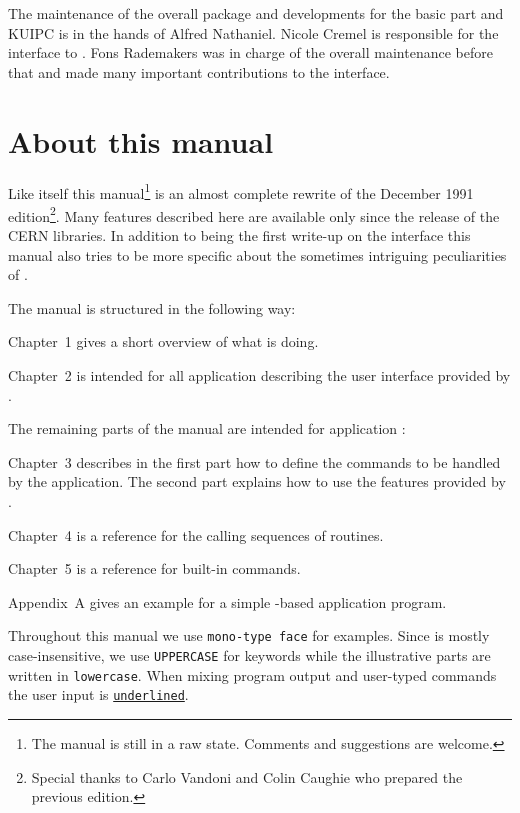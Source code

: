 The maintenance of the overall package and developments for the basic
part and KUIPC is in the hands of Alfred Nathaniel.
Nicole Cremel is responsible for the \KUIP{} interface to \OSFMotif{}.
Fons Rademakers was in charge of the overall maintenance before
that and made many important contributions to the \KUIPMotif{} interface.


\section*{About this manual}
 
Like \KUIP{} itself this manual\footnote{
The manual is still in a raw state.
Comments and suggestions are welcome.
}
is an almost complete rewrite of the
December 1991 edition\footnote{
Special thanks to Carlo Vandoni and Colin Caughie who prepared the
previous edition.
}.
Many features described here are available only since the
 release of the CERN libraries.
In addition to being the first write-up on the \KUIPMotif{} interface
this manual also tries to be more specific about the sometimes
intriguing peculiarities of \KUIP{}.

The manual is structured in the following way:
\begin{UL}
\item
Chapter~1 gives a short overview of what \KUIP{} is doing.
\item
Chapter~2 is intended for all application  describing
the user interface provided by \KUIP{}. 
\end{UL}
The remaining parts of the manual are intended for application
:
\begin{UL}
\item
Chapter~3 describes in the first part how to define the commands to be
handled by the application.
The second part explains how to use the features provided by \KUIPMotif{}.
\item
Chapter~4 is a reference for the calling sequences of \KUIP{}
routines.
\item
Chapter~5 is a reference for \KUIP{} built-in commands.
\item
Appendix~A gives an example for a simple \KUIP{}-based application program.
\end{UL}

Throughout this manual we use \texttt{mono-type face} for examples.
Since \KUIP{} is mostly case-insensitive, we use \texttt{UPPERCASE} for
keywords while the illustrative parts are written in
\texttt{lowercase}.
When mixing program output and user-typed commands the user input is
\texttt{\underline{underlined}}.

